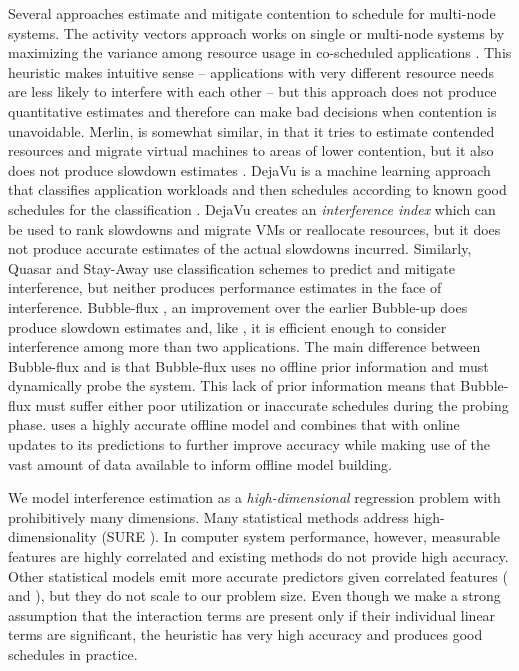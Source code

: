 Several approaches estimate and mitigate contention to schedule for
multi-node systems.  The activity vectors approach works on single or
multi-node systems by maximizing the variance among resource usage in
co-scheduled applications \cite{merkel2010resource}.  This heuristic
makes intuitive sense -- applications with very different resource
needs are less likely to interfere with each other -- but this
approach does not produce quantitative estimates and therefore can
make bad decisions when contention is unavoidable.  Merlin, is
somewhat similar, in that it tries to estimate contended resources and
migrate virtual machines to areas of lower contention, but it also
does not produce slowdown estimates \cite{Merlin}.  DejaVu is a
machine learning approach that classifies application workloads and
then schedules according to known good schedules for the
classification \cite{dejavu}. DejaVu creates an \emph{interference
  index} which can be used to rank slowdowns and migrate VMs or
reallocate resources, but it does not produce accurate estimates of
the actual slowdowns incurred.  Similarly, Quasar \cite{quasar} and
Stay-Away \cite{stay-away} use classification schemes to predict and
mitigate interference, but neither produces performance estimates in
the face of interference.  Bubble-flux \cite{Bubble-flux}, an
improvement over the earlier Bubble-up \cite{Bubble-up} does produce
slowdown estimates and, like \SYSTEM{}, it is efficient enough to
consider interference among more than two applications.  The main
difference between Bubble-flux and \SYSTEM{} is that Bubble-flux uses
no offline prior information and must dynamically probe the system.
This lack of prior information means that Bubble-flux must suffer
either poor utilization or inaccurate schedules during the probing
phase.  \SYSTEM{} uses a highly accurate offline model and combines
that with online updates to its predictions to further improve
accuracy while making use of the vast amount of data available to
inform offline model building.

We model interference estimation as a \emph{high-dimensional}
regression problem with prohibitively many dimensions.  Many
statistical methods address high-dimensionality (\eg SURE
\cite{fan2008sure}). In computer system performance, however,
measurable features are highly correlated and existing methods do not
provide high accuracy.  Other statistical models emit more accurate
predictors given correlated features (\eg \cite{yuan2006model} and
\cite{bien2013lasso}), but they do not scale to our problem size.
Even though we make a strong assumption that the interaction terms are
present only if their individual linear terms are significant, the
heuristic has very high accuracy and produces good schedules in
practice.
